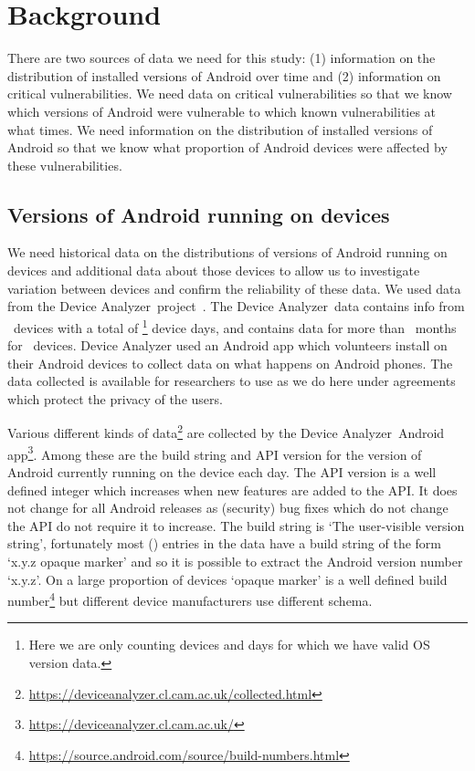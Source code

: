 \documentclass[conference,a4paper,twoside]{IEEEtran}
\newcommand{\da}{Device Analyzer}
\newcommand{\daNumDevices}{\daNumOSDevices}
\newcommand{\daDeviceDays}{\daOSTotalDaysData}
\begin{document}
\section{Background}
\label{sec:background}
There are two sources of data we need for this study: (1) information on the distribution of installed versions of Android over time and (2) information on critical vulnerabilities.
We need data on critical vulnerabilities so that we know which versions of Android were vulnerable to which known vulnerabilities at what times.
We need information on the distribution of installed versions of Android so that we know what proportion of Android devices were affected by these vulnerabilities.


\subsection{Versions of Android running on devices}
We need historical data on the distributions of versions of Android running on devices and additional data about those devices to allow us to investigate variation between devices and confirm the reliability of these data.
We used data from the \da\ project~\cite{Wagner2013}.
The \da\ data contains info from \daNumDevices\ devices with a total of \daDeviceDays\footnote{Here we are only counting devices and days for which we have valid OS version data.} device days, and contains data for more than \daMonths\ months for \daMonthsDevices\ devices.
Device Analyzer used an Android app which volunteers install on their Android devices to collect data on what happens on Android phones.
The data collected is available for researchers to use as we do here under agreements which protect the privacy of the users.

Various different kinds of data\footnote{\url{https://deviceanalyzer.cl.cam.ac.uk/collected.html}} are collected by the \da\ Android app\footnote{\url{https://deviceanalyzer.cl.cam.ac.uk/}}.
Among these are the build string and API version for the version of Android currently running on the device each day.
The API version is a well defined integer which increases when new features are added to the API.
It does not change for all Android releases as (security) bug fixes which do not change the API do not require it to increase.
The build string is `The user-visible version string', fortunately most (\daOSVersionPercValidLines) entries in the data have a build string of the form `x.y.z opaque marker' and so it is possible to extract the Android version number `x.y.z'.
On a large proportion of devices `opaque marker' is a well defined build number\footnote{\url{https://source.android.com/source/build-numbers.html}} but different device manufacturers use different schema.
\end{document}
